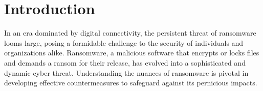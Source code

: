 \documentclass[12pt,twocolumn]{article}
\begin{document}
\section[Introduction]{Introduction}
In an era dominated by digital connectivity, the persistent threat of ransomware looms large, posing a formidable challenge to the security of individuals and organizations alike. Ransomware, a malicious software that encrypts or locks files and demands a ransom for their release, has evolved into a sophisticated and dynamic cyber threat. Understanding the nuances of ransomware is pivotal in developing effective countermeasures to safeguard against its pernicious impacts.

\lipsum[1-3] %
\end{document}
